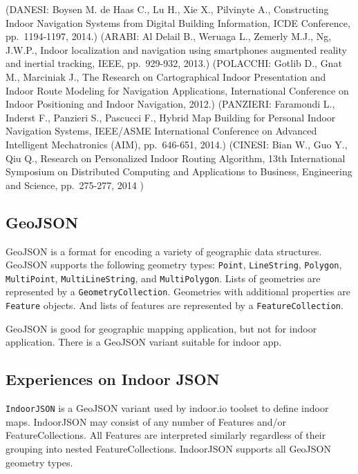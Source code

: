\documentclass{sig-alternate}
\begin{document}
(DANESI: Boysen M. de Haas C., Lu H., Xie X., Pilvinyte A., Constructing
Indoor Navigation Systems from Digital Building Information, ICDE
Conference, pp.~1194-1197, 2014.) (ARABI: Al Delail B., Weruaga L.,
Zemerly M.J., Ng, J.W.P., Indoor localization and navigation using
smartphones augmented reality and inertial tracking, IEEE, pp.~929-932,
2013.) (POLACCHI: Gotlib D., Gnat M., Marciniak J., The Research on
Cartographical Indoor Presentation and Indoor Route Modeling for
Navigation Applications, International Conference on Indoor Positioning
and Indoor Navigation, 2012.) (PANZIERI: Faramondi L., Inderst F.,
Panzieri S., Pascucci F., Hybrid Map Building for Personal Indoor
Navigation Systems, IEEE/ASME International Conference on Advanced
Intelligent Mechatronics (AIM), pp.~646-651, 2014.) (CINESI: Bian W.,
Guo Y., Qiu Q., Research on Personalized Indoor Routing Algorithm, 13th
International Symposium on Distributed Computing and Applications to
Business, Engineering and Science, pp.~275-277, 2014 )

\subsection{GeoJSON}\label{geojson}

GeoJSON is a format for encoding a variety of geographic data
structures. GeoJSON supports the following geometry types:
\texttt{Point}, \texttt{LineString}, \texttt{Polygon},
\texttt{MultiPoint}, \texttt{MultiLineString}, and
\texttt{MultiPolygon}. Lists of geometries are represented by a
\texttt{GeometryCollection}. Geometries with additional properties are
\texttt{Feature} objects. And lists of features are represented by a
\texttt{FeatureCollection}.

GeoJSON is good for geographic mapping application, but not for indoor
application. There is a GeoJSON variant suitable for indoor app.

\subsection{Experiences on Indoor
JSON}\label{experiences-on-indoor-json}

\texttt{IndoorJSON} is a GeoJSON variant used by indoor.io toolset to
define indoor maps. IndoorJSON may consist of any number of Features
and/or FeatureCollections. All Features are interpreted similarly
regardless of their grouping into nested FeatureCollections. IndoorJSON
supports all GeoJSON geometry types.
\end{document}
